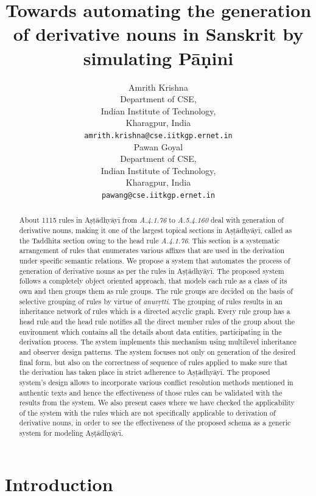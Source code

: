 \documentclass[11pt]{article}
\title{Towards automating the generation of derivative nouns in Sanskrit by simulating Pāṇini}
\author{Amrith Krishna \\
  Department of CSE, \\
  Indian Institute of Technology, \\
  Kharagpur, India \\
  {\tt amrith.krishna@cse.iitkgp.ernet.in} \\\And
  Pawan Goyal \\
  Department of CSE, \\
  Indian Institute of Technology, \\
  Kharagpur, India \\
  {\tt pawang@cse.iitkgp.ernet.in} \\}
\date{}
\begin{document}
\maketitle
\begin{abstract}
About 1115 rules in Aṣṭādhyāyī from {\sl A.4.1.76} to {\sl A.5.4.160} deal with generation of derivative nouns, making it one of the largest topical sections in Aṣṭādhyāyī, called as the Taddhita section owing to the head rule {\sl A.4.1.76}. This section is a systematic arrangement of rules that enumerates various affixes that are used in the derivation under specific semantic relations. We propose a system that automates the process of generation of derivative nouns as per the rules in Aṣṭādhyāyī. The proposed system follows a completely object oriented approach, that models each rule as a class of its own and then groups them as rule groups. The rule groups are decided on the basis of selective grouping of rules by virtue of {\sl anuvṛtti}. The grouping of rules results in an inheritance network of rules which is a directed acyclic graph. Every rule group has a head rule and the head rule notifies all the direct member rules of the group about the environment which contains all the details about data entities, participating in the derivation process. The system implements this mechanism using multilevel inheritance and observer design patterns. The system focuses not only on generation of the desired final form, but also on the correctness of sequence of rules applied to make sure that the derivation has taken place in strict adherence to Aṣṭādhyāyī. The proposed system's design allows to incorporate various conflict resolution methods mentioned in authentic texts and hence the effectiveness of those rules can be validated with the results from the system. We also present cases where we have checked the applicability of the system with the rules which are not specifically applicable to derivation of derivative nouns, in order to see the effectiveness of the proposed schema as a generic system for modeling Aṣṭādhyāyī. 
 
\end{abstract}

\section{Introduction}
\end{document}
